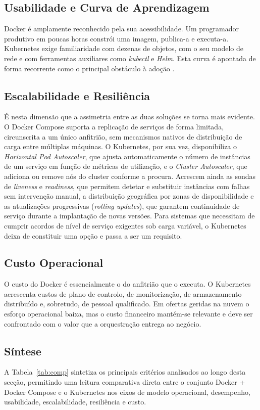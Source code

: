 \documentclass[conference]{IEEEtran}
\begin{document}
\subsection{Usabilidade e Curva de Aprendizagem}
Docker é amplamente reconhecido pela sua acessibilidade. Um programador produtivo em poucas horas constrói uma imagem, publica-a e executa-a. Kubernetes exige familiaridade com dezenas de objetos, com o seu modelo de rede e com ferramentas auxiliares como \textit{kubectl} e \textit{Helm}. Esta curva é apontada de forma recorrente como o principal obstáculo à adoção \cite{kratzke2017}.

\subsection{Escalabilidade e Resiliência}
É nesta dimensão que a assimetria entre as duas soluções se torna mais evidente. O Docker Compose suporta a replicação de serviços de forma limitada, circunscrita a um único anfitrião, sem mecanismos nativos de distribuição de carga entre múltiplas máquinas. O Kubernetes, por sua vez, disponibiliza o \textit{Horizontal Pod Autoscaler}, que ajusta automaticamente o número de instâncias de um serviço em função de métricas de utilização, e o \textit{Cluster Autoscaler}, que adiciona ou remove nós do cluster conforme a procura. Acrescem ainda as sondas de \textit{liveness} e \textit{readiness}, que permitem detetar e substituir instâncias com falhas sem intervenção manual, a distribuição geográfica por zonas de disponibilidade e as atualizações progressivas (\textit{rolling updates}), que garantem continuidade de serviço durante a implantação de novas versões. Para sistemas que necessitam de cumprir acordos de nível de serviço exigentes sob carga variável, o Kubernetes deixa de constituir uma opção e passa a ser um requisito.

\subsection{Custo Operacional}
O custo do Docker é essencialmente o do anfitrião que o executa. O Kubernetes acrescenta custos de plano de controlo, de monitorização, de armazenamento distribuído e, sobretudo, de pessoal qualificado. Em ofertas geridas na nuvem o esforço operacional baixa, mas o custo financeiro mantém-se relevante e deve ser confrontado com o valor que a orquestração entrega ao negócio.

\subsection{Síntese}
A Tabela~\ref{tab:comp} sintetiza os principais critérios analisados ao longo desta secção, permitindo uma leitura comparativa direta entre o conjunto Docker + Docker Compose e o Kubernetes nos eixos de modelo operacional, desempenho, usabilidade, escalabilidade, resiliência e custo.
\end{document}
